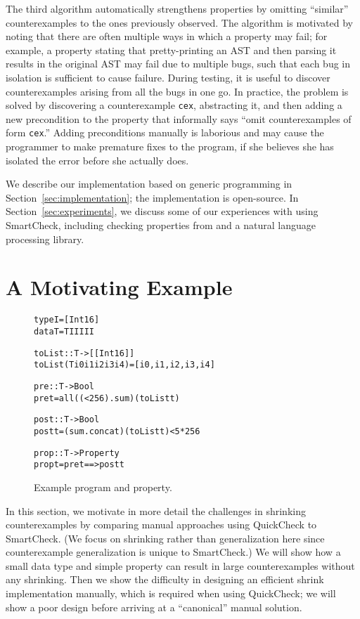 \documentclass{sigplanconf}
\newenvironment{code}{\begin{alltt}\footnotesize}{\end{alltt}}
\newcommand{\ttp}[1]{\texttt{#1}}
\begin{document}
The third algorithm automatically strengthens properties by omitting ``similar''
counterexamples to the ones previously observed.  The algorithm is motivated by
noting that there are often multiple ways in which a property may fail; for
example, a property stating that pretty-printing an AST and then parsing it
results in the original AST may fail due to multiple bugs, such that each bug in
isolation is sufficient to cause failure.  During testing, it is useful to
discover counterexamples arising from all the bugs in one go.  In practice, the
problem is solved by discovering a counterexample \ttp{cex}, abstracting it, and
then adding a new precondition to the property that informally says ``omit
counterexamples of form \ttp{cex}.''  Adding preconditions manually is laborious
and may cause the programmer to make premature fixes to the program, if she
believes she has isolated the error before she actually does.

We describe our implementation based on generic programming in
Section~\ref{sec:implementation}; the implementation is open-source.  In
Section~\ref{sec:experiments}, we discuss some of our experiences with using
SmartCheck, including checking properties from \xmonad and a natural language
processing library.

\section{A Motivating Example}\label{sec:example}

\begin{figure}[ht]
\begin{code}
type I   = [Int16]
data T   = T I I I I I

toList :: T -> [[Int16]]
toList (T i0 i1 i2 i3 i4) = [i0, i1, i2, i3, i4]

pre :: T -> Bool
pre t = all ((< 256) . sum) (toList t)

post :: T -> Bool
post t = (sum . concat) (toList t) < 5 * 256

prop :: T -> Property
prop t = pre t ==> post t
\end{code}
  \caption{Example program and property.}
  \label{fig:initial}
\end{figure}

In this section, we motivate in more detail the challenges in shrinking
counterexamples by comparing manual approaches using QuickCheck to SmartCheck.
(We focus on shrinking rather than generalization here since counterexample
generalization is unique to SmartCheck.)  We will show how a small data type and
simple property can result in large counterexamples without any shrinking.  Then
we show the difficulty in designing an efficient shrink implementation manually,
which is required when using QuickCheck; we will show a poor
design before arriving at a ``canonical'' manual solution.%
\end{document}
